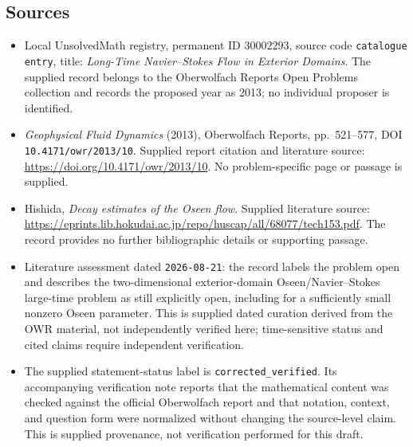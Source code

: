 \documentclass[11pt]{article}
\begin{document}
\subsection{Sources}
\begin{itemize}
\item Local UnsolvedMath registry, permanent ID \(30002293\), source code \texttt{catalogue entry}, title: \emph{Long-Time Navier--Stokes Flow in Exterior Domains}. The supplied record belongs to the Oberwolfach Reports Open Problems collection and records the proposed year as 2013; no individual proposer is identified.
\item \emph{Geophysical Fluid Dynamics} (2013), Oberwolfach Reports, pp.~521--577, DOI \texttt{10.4171/owr/2013/10}. Supplied report citation and literature source: \url{https://doi.org/10.4171/owr/2013/10}. No problem-specific page or passage is supplied.
\item Hishida, \emph{Decay estimates of the Oseen flow}. Supplied literature source: \url{https://eprints.lib.hokudai.ac.jp/repo/huscap/all/68077/tech153.pdf}. The record provides no further bibliographic details or supporting passage.
\item Literature assessment dated \texttt{2026-08-21}: the record labels the problem open and describes the two-dimensional exterior-domain Oseen/Navier--Stokes large-time problem as still explicitly open, including for a sufficiently small nonzero Oseen parameter. This is supplied dated curation derived from the OWR material, not independently verified here; time-sensitive status and cited claims require independent verification.
\item The supplied statement-status label is \texttt{corrected\_verified}. Its accompanying verification note reports that the mathematical content was checked against the official Oberwolfach report and that notation, context, and question form were normalized without changing the source-level claim. This is supplied provenance, not verification performed for this draft.
\end{itemize}
\end{document}
